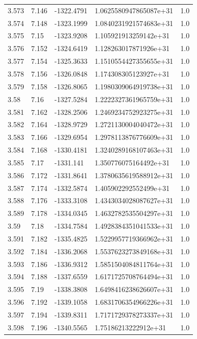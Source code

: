 \begin{tabular}{lllll}
3.573 & 7.146 & -1322.4791 & 1.0625580947865087e+31 & 1.0 \\
3.574 & 7.148 & -1323.1999 & 1.0840231921574683e+31 & 1.0 \\
3.575 & 7.15 & -1323.9208 & 1.105921913259142e+31 & 1.0 \\
3.576 & 7.152 & -1324.6419 & 1.128263017871926e+31 & 1.0 \\
3.577 & 7.154 & -1325.3633 & 1.1510554427355655e+31 & 1.0 \\
3.578 & 7.156 & -1326.0848 & 1.174308305123927e+31 & 1.0 \\
3.579 & 7.158 & -1326.8065 & 1.1980309064919738e+31 & 1.0 \\
3.58 & 7.16 & -1327.5284 & 1.2222327361965759e+31 & 1.0 \\
3.581 & 7.162 & -1328.2506 & 1.2469234752923275e+31 & 1.0 \\
3.582 & 7.164 & -1328.9729 & 1.2721130004040472e+31 & 1.0 \\
3.583 & 7.166 & -1329.6954 & 1.2978113876776609e+31 & 1.0 \\
3.584 & 7.168 & -1330.4181 & 1.3240289168107463e+31 & 1.0 \\
3.585 & 7.17 & -1331.141 & 1.350776075164492e+31 & 1.0 \\
3.586 & 7.172 & -1331.8641 & 1.3780635619588912e+31 & 1.0 \\
3.587 & 7.174 & -1332.5874 & 1.405902292552499e+31 & 1.0 \\
3.588 & 7.176 & -1333.3108 & 1.4343034028087627e+31 & 1.0 \\
3.589 & 7.178 & -1334.0345 & 1.4632782535504297e+31 & 1.0 \\
3.59 & 7.18 & -1334.7584 & 1.4928384351041533e+31 & 1.0 \\
3.591 & 7.182 & -1335.4825 & 1.5229957719366962e+31 & 1.0 \\
3.592 & 7.184 & -1336.2068 & 1.5537623273849168e+31 & 1.0 \\
3.593 & 7.186 & -1336.9312 & 1.5851504084811764e+31 & 1.0 \\
3.594 & 7.188 & -1337.6559 & 1.6171725708764494e+31 & 1.0 \\
3.595 & 7.19 & -1338.3808 & 1.6498416238626607e+31 & 1.0 \\
3.596 & 7.192 & -1339.1058 & 1.6831706354966226e+31 & 1.0 \\
3.597 & 7.194 & -1339.8311 & 1.7171729378273337e+31 & 1.0 \\
3.598 & 7.196 & -1340.5565 & 1.75186213222912e+31 & 1.0 \\

\end{tabular}
